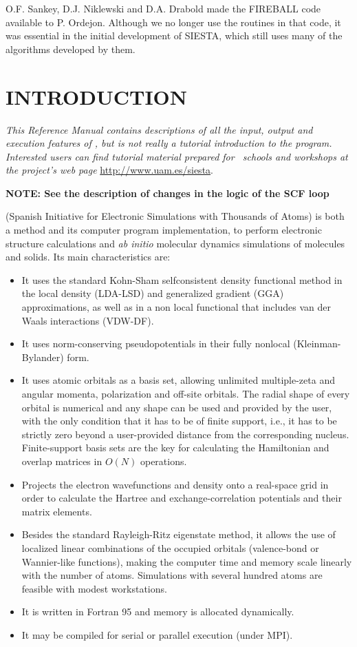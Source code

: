 O.F. Sankey, D.J. Niklewski and D.A. Drabold made the FIREBALL code
available to P. Ordejon.  Although we no longer use the routines in
that code, it was essential in the initial development of SIESTA,
which still uses many of the algorithms developed by them.

\newpage
\tableofcontents
\newpage

\section{INTRODUCTION}

\textit{This Reference Manual contains descriptions of all the input,
  output and execution features of \siesta, but is not really a
  tutorial introduction to the program. Interested users can find
  tutorial material prepared for \siesta\ schools and workshops at
  the project's web page} \url{http://www.uam.es/siesta}.


\textbf{NOTE: See the description of changes in the logic of the SCF loop}

\siesta{} (Spanish Initiative for
Electronic Simulations with
Thousands of Atoms) is both a method and its computer program implementation,
to perform electronic structure calculations and \textit{ab initio} molecular
dynamics simulations of molecules and solids. Its main characteristics are:
\begin{itemize}
\item
It uses the standard Kohn-Sham selfconsistent density functional
method in the local density (LDA-LSD) and generalized gradient (GGA)
approximations, as well as in a non local functional that includes
van der Waals interactions (VDW-DF).
\item
It uses norm-conserving pseudopotentials in their fully nonlocal
(Kleinman-Bylander) form.
\item
It uses atomic orbitals as a basis set, allowing unlimited multiple-zeta
and angular momenta, polarization and off-site orbitals. The radial
shape of every orbital is numerical and any shape can be used and provided
by the user, with the only condition that it has to be of finite support,
i.e., it has to be strictly zero beyond a user-provided distance from the
corresponding nucleus.
Finite-support basis sets are the key for calculating the Hamiltonian
and overlap matrices in $O(N)$ operations.
\item
Projects the electron wavefunctions and density onto a real-space
grid in order to calculate the Hartree and exchange-correlation
potentials and their matrix elements.
\item
Besides the standard Rayleigh-Ritz eigenstate method, it allows
the use of localized linear combinations of the occupied orbitals
(valence-bond or Wannier-like functions), making the computer
time and memory scale linearly with the number of atoms.
Simulations with several hundred atoms are feasible with
modest workstations.
\item
It is written in Fortran 95 and memory is allocated dynamically.
\item
It may be compiled for serial or parallel execution (under MPI).

\end{itemize}

